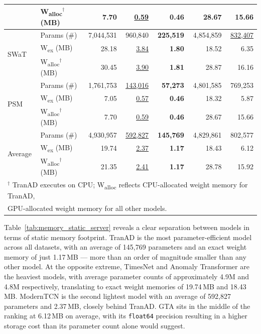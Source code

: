 \documentclass[twoside,11pt,openright]{report}
\begin{document}
\begin{table}[ht]
\begin{tabular}{ll rrrrr}
    & W\textsubscript{alloc}$^\dagger$ (MB) &  7.70 &  \underline{0.59} & \textbf{0.46} & 28.67 & 15.66 \\
\midrule
\multirow{3}{*}{SWaT}
    & Params (\#)             & 7{,}044{,}531 & 960{,}840 & \textbf{225{,}519} & 4{,}854{,}859 & \underline{832{,}407} \\
    & W\textsubscript{ex} (MB)  &  28.18 & \underline{3.84} & \textbf{1.80} & 18.52 &  6.35 \\
    & W\textsubscript{alloc}$^\dagger$ (MB) &  30.45 & \underline{3.90} & \textbf{1.81} & 28.87 & 16.16 \\
\midrule
\multirow{3}{*}{PSM}
    & Params (\#)             & 1{,}761{,}753 & \underline{143{,}016} & \textbf{57{,}273} & 4{,}801{,}585 & 769{,}253 \\
    & W\textsubscript{ex} (MB)  &  7.05 &  \underline{0.57} & \textbf{0.46} & 18.32 &  5.87 \\
    & W\textsubscript{alloc}$^\dagger$ (MB) &  7.70 &  \underline{0.59} & \textbf{0.46} & 28.67 & 15.66 \\
\midrule
\multirow{3}{*}{Average}
    & Params (\#)             & 4{,}930{,}957 & \underline{592{,}827} & \textbf{145{,}769} & 4{,}829{,}861 & 802{,}577 \\
    & W\textsubscript{ex} (MB)  &  19.74 & \underline{2.37} & \textbf{1.17} & 18.43 &  6.12 \\
    & W\textsubscript{alloc}$^\dagger$ (MB) &  21.35 & \underline{2.41} & \textbf{1.17} & 28.78 & 15.92 \\
\bottomrule
\multicolumn{7}{l}{\footnotesize $^\dagger$ TranAD executes on CPU; W\textsubscript{alloc} reflects CPU-allocated weight memory for TranAD,}\\
\multicolumn{7}{l}{\footnotesize \phantom{$^\dagger$} GPU-allocated weight memory for all other models.}
\end{tabular}
\end{table}

Table~\ref{tab:memory_static_server} reveals a clear separation between models in terms 
of static memory footprint. TranAD \citep{tranad2022} is the most parameter-efficient 
model across all datasets, with an average of 145{,}769 parameters and an exact weight 
memory of just 1.17\,MB --- more than an order of magnitude smaller than any other model. 
At the opposite extreme, TimesNet \citep{timesnet2023} and Anomaly Transformer 
\citep{anomalytransformer2022} are the heaviest models, with average parameter counts of 
approximately 4.9M and 4.8M respectively, translating to exact weight memories of 19.74\,MB 
and 18.43\,MB. ModernTCN \citep{moderntcn2024} is the second lightest model with an average of 
592{,}827 parameters and 2.37\,MB, closely behind TranAD. GTA \citep{gta2022} sits 
in the middle of the ranking at 6.12\,MB on average, with its \texttt{float64} precision 
resulting in a higher storage cost than its parameter count alone would suggest. 
\end{document}
